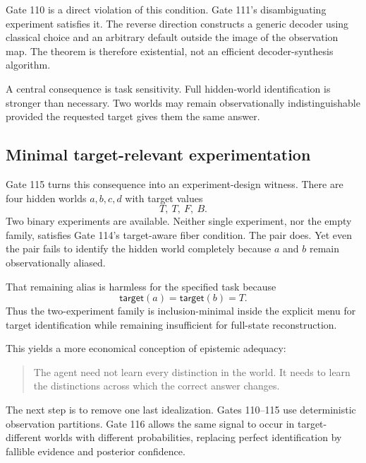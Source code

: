 Gate 110 is a direct violation of this condition. Gate 111's disambiguating experiment satisfies it. The reverse direction constructs a generic decoder using classical choice and an arbitrary default outside the image of the observation map. The theorem is therefore existential, not an efficient decoder-synthesis algorithm.

A central consequence is task sensitivity. Full hidden-world identification is stronger than necessary. Two worlds may remain observationally indistinguishable provided the requested target gives them the same answer.

\subsection{Minimal target-relevant experimentation}

Gate 115 turns this consequence into an experiment-design witness. There are four hidden worlds $a,b,c,d$ with target values
\[
T,\ T,\ F,\ B.
\]
Two binary experiments are available. Neither single experiment, nor the empty family, satisfies Gate 114's target-aware fiber condition. The pair does. Yet even the pair fails to identify the hidden world completely because $a$ and $b$ remain observationally aliased.

That remaining alias is harmless for the specified task because
\[
\mathsf{target}(a)=\mathsf{target}(b)=T.
\]
Thus the two-experiment family is inclusion-minimal inside the explicit menu for target identification while remaining insufficient for full-state reconstruction.

This yields a more economical conception of epistemic adequacy:
\begin{quote}
The agent need not learn every distinction in the world. It needs to learn the distinctions across which the correct answer changes.
\end{quote}
The next step is to remove one last idealization. Gates 110--115 use deterministic observation partitions. Gate 116 allows the same signal to occur in target-different worlds with different probabilities, replacing perfect identification by fallible evidence and posterior confidence.
